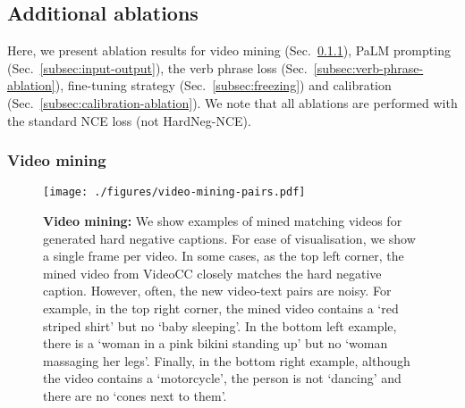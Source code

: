 \subsection{Additional ablations}\label{subsec:app:ablations}

Here, we present ablation results for video mining (Sec.~\ref{subsec:video-mining}), PaLM prompting (Sec.~\ref{subsec:input-output}), the verb phrase loss (Sec.~\ref{subsec:verb-phrase-ablation}), fine-tuning strategy (Sec.~\ref{subsec:freezing}) and calibration (Sec.~\ref{subsec:calibration-ablation}). We note that all ablations are performed with the standard NCE loss (not HardNeg-NCE).


\subsubsection{Video mining}\label{subsec:video-mining}


\begin{figure*}[ht!]
    \centering
    \texttt{[image: ./figures/video-mining-pairs.pdf]}
    \caption{\textbf{Video mining:} We show examples of mined matching videos for generated hard negative captions. For ease of visualisation, we show a single frame per video. In some cases, as the top left corner, the mined video from VideoCC closely matches the hard negative caption. However, often, the new video-text pairs are noisy. For example, in the top right corner, the mined video contains a `red striped shirt' but no `baby sleeping'. In the bottom left example, there is a `woman in a pink bikini standing up' but no `woman massaging her legs'. Finally, in the bottom right example, although the video contains a `motorcycle', the person is not `dancing' and there are no `cones next to them'. }
    \label{fig:video-mining}

\end{figure*}

